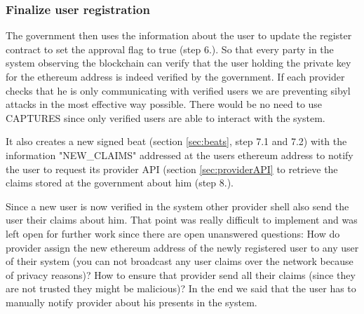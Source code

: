 \subsubsection{Finalize user registration}
The government then uses the information about the user to update the register contract to set the approval flag to true (step 6.). So that every party in the system observing the blockchain can verify that the user holding the private key for the ethereum address is indeed verified by the government. If each provider checks that he is only communicating with verified users we are preventing sibyl attacks in the most effective way possible. There would be no need to use CAPTURES since only verified users are able to interact with the system. 

It also creates a new signed beat (section \ref{sec:beats}, step 7.1 and 7.2) with the information "NEW\_CLAIMS" addressed at the users ethereum address to notify the user to request its provider API (section \ref{sec:providerAPI} to retrieve the claims stored at the government about him (step 8.). 

Since a new user is now verified in the system other provider shell also send the user their claims about him. That point was really difficult to implement and was left open for further work since there are open unanswered questions: How do provider assign the new ethereum address of the newly registered user to any user of their system (you can not broadcast any user claims over the network because of privacy reasons)? How to ensure that provider send all their claims (since they are not trusted they might be malicious)? 
In the end we said that the user has to manually notify provider about his presents in the system.
